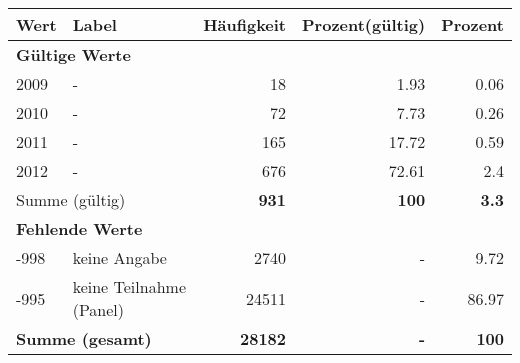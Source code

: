      \begin{longtable}{lXrrr}
     \toprule
     \textbf{Wert} & \textbf{Label} & \textbf{Häufigkeit} & \textbf{Prozent(gültig)} & \textbf{Prozent} \\
     \endhead
     \midrule
     \multicolumn{5}{l}{\textbf{Gültige Werte}}\\

     2009 &
     \multicolumn{1}{X}{ -  } &


       \num{18} &
       \num[round-mode=places,round-precision=2]{1.93} &
         \num[round-mode=places,round-precision=2]{0.06} \\

     2010 &
     \multicolumn{1}{X}{ -  } &


       \num{72} &
       \num[round-mode=places,round-precision=2]{7.73} &
         \num[round-mode=places,round-precision=2]{0.26} \\

     2011 &
     \multicolumn{1}{X}{ -  } &


       \num{165} &
       \num[round-mode=places,round-precision=2]{17.72} &
         \num[round-mode=places,round-precision=2]{0.59} \\

     2012 &
     \multicolumn{1}{X}{ -  } &


       \num{676} &
       \num[round-mode=places,round-precision=2]{72.61} &
         \num[round-mode=places,round-precision=2]{2.4} \\
     \midrule
     \multicolumn{2}{l}{Summe (gültig)} &
       \textbf{\num{931}} &
     \textbf{100} &
       \textbf{\num[round-mode=places,round-precision=2]{3.3}} \\
     \multicolumn{5}{l}{\textbf{Fehlende Werte}}\\
       -998 &
       keine Angabe &
         \num{2740} &
        - &
         \num[round-mode=places,round-precision=2]{9.72} \\
       -995 &
       keine Teilnahme (Panel) &
         \num{24511} &
        - &
         \num[round-mode=places,round-precision=2]{86.97} \\
     \midrule
     \multicolumn{2}{l}{\textbf{Summe (gesamt)}} &
          \textbf{\num{28182}} &
        \textbf{-} &
        \textbf{100} \\
     \bottomrule
     \end{longtable}
     
